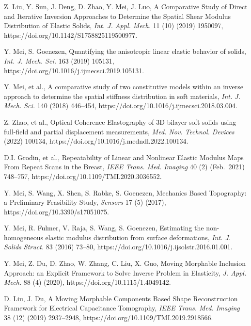 \documentclass[11pt]{article}
\begin{document}
\begin{list}{}{%
  \setlength{\leftmargin}{2em}%
  \setlength{\itemindent}{-2em}%
  \setlength{\itemsep}{0.5em}%
  \setlength{\parsep}{0pt}%
}
\item [20] Z. Liu, Y. Sun, J. Deng, D. Zhao, Y. Mei, J. Luo, A
Comparative Study of Direct and Iterative Inversion Approaches
to Determine the Spatial Shear Modulus Distribution of Elastic
Solids, \emph{Int. J. Appl. Mech.} 11 (10) (2019) 1950097,
https://doi.org/10.1142/S1758825119500977.

\item [21] Y. Mei, S. Goenezen, Quantifying the anisotropic
linear elastic behavior of solids, \emph{Int. J. Mech. Sci.}
163 (2019) 105131,
https://doi.org/10.1016/j.ijmecsci.2019.105131.

\item [22] Y. Mei, et al., A comparative study of two
constitutive models within an inverse approach to determine
the spatial stiffness distribution in soft materials,
\emph{Int. J. Mech. Sci.} 140 (2018) 446--454,
https://doi.org/10.1016/j.ijmecsci.2018.03.004.

\item [23] Z. Zhao, et al., Optical Coherence Elastography of
3D bilayer soft solids using full-field and partial displacement
measurements, \emph{Med. Nov. Technol. Devices} (2022) 100134,
https://doi.org/10.1016/j.medndl.2022.100134.

\item [24] D.I. Grodin, et al., Repeatability of Linear and
Nonlinear Elastic Modulus Maps From Repeat Scans in the Breast,
\emph{IEEE Trans. Med. Imaging} 40 (2) (Feb.~2021) 748--757,
https://doi.org/10.1109/TMI.2020.3036552.

\item [25] Y. Mei, S. Wang, X. Shen, S. Rabke, S. Goenezen,
Mechanics Based Topography: a Preliminary Feasibility Study,
\emph{Sensors} 17 (5) (2017),
https://doi.org/10.3390/s17051075.

\item [26] Y. Mei, R. Fulmer, V. Raja, S. Wang, S. Goenezen,
Estimating the non-homogeneous elastic modulus distribution
from surface deformations, \emph{Int. J. Solids Struct.} 83
(2016) 73--80, https://doi.org/10.1016/j.ijsolstr.2016.01.001.

\item [27] Y. Mei, Z. Du, D. Zhao, W. Zhang, C. Liu, X. Guo,
Moving Morphable Inclusion Approach: an Explicit Framework to
Solve Inverse Problem in Elasticity, \emph{J. Appl. Mech.} 88
(4) (2020), https://doi.org/10.1115/1.4049142.

\item [28] D. Liu, J. Du, A Moving Morphable Components Based
Shape Reconstruction Framework for Electrical Capacitance
Tomography, \emph{IEEE Trans. Med. Imaging} 38 (12) (2019)
2937--2948, https://doi.org/10.1109/TMI.2019.2918566.


\end{list}
\end{document}
